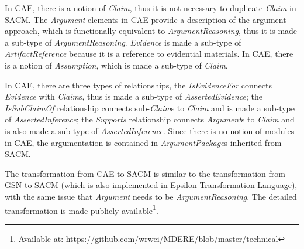 In CAE, there is a notion of \textit{Claim}, thus it is not necessary to duplicate \textit{Claim} in SACM. 
The \textit{Argument} elements in CAE provide a description of the argument approach, which is functionally equivalent to \textit{ArgumentReasoning}, thus it is made a sub-type of \textit{ArgumentReasoning}.
\textit{Evidence} is made a sub-type of \textit{ArtifactReference} because it is a reference to evidential materials. 
In CAE, there is a notion of \textit{Assumption}, which is made a sub-type of \textit{Claim}. 

In CAE, there are three types of relationships, the \textit{IsEvidenceFor} connects \textit{Evidence} with \textit{Claim}s, thus is made a sub-type of \textit{AssertedEvidence}; the \textit{IsSubClaimOf} relationship connects sub-\textit{Claim}s to \textit{Claim} and is made a sub-type of \textit{AssertedInference}; the \textit{Supports} relationship connects \textit{Argument}s to \textit{Claim} and is also made a sub-type of \textit{AssertedInference}. 
Since there is no notion of modules in CAE, the argumentation is contained in \textit{ArgumentPackage}s inherited from SACM.

The transformation from CAE to SACM is similar to the transformation from GSN to SACM (which is also implemented in Epsilon Transformation Language), with the same issue that \textit{Argument} needs to be \textit{ArgumentReasoning}. 
The detailed transformation is made publicly available\footnote{Available at: \url{https://github.com/wrwei/MDERE/blob/master/technical}}.



